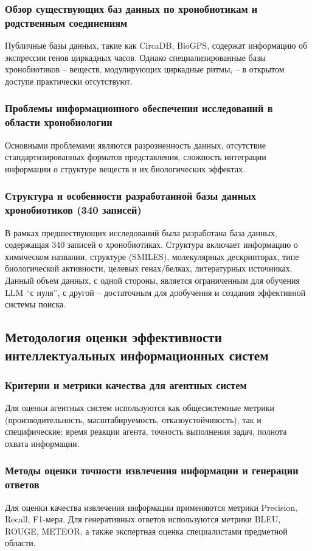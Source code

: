 \documentclass[a4paper,14pt]{extarticle}
\begin{document}
	\subsubsection{Обзор существующих баз данных по хронобиотикам и родственным соединениям}
	Публичные базы данных, такие как CircaDB, BioGPS, содержат информацию об экспрессии генов циркадных часов. Однако специализированные базы хронобиотиков – веществ, модулирующих циркадные ритмы, – в открытом доступе практически отсутствуют.
	
	\subsubsection{Проблемы информационного обеспечения исследований в области хронобиологии}
	Основными проблемами являются разрозненность данных, отсутствие стандартизированных форматов представления, сложность интеграции информации о структуре веществ и их биологических эффектах.
	
	\subsubsection{Структура и особенности разработанной базы данных хронобиотиков (340 записей)}
	В рамках предшествующих исследований была разработана база данных, содержащая 340 записей о хронобиотиках. Структура включает информацию о химическом названии, структуре (SMILES), молекулярных дескрипторах, типе биологической активности, целевых генах/белках, литературных источниках. Данный объем данных, с одной стороны, является ограниченным для обучения LLM ``с нуля'', с другой – достаточным для дообучения и создания эффективной системы поиска.
	
	\subsection{Методология оценки эффективности интеллектуальных информационных систем}
	
	\subsubsection{Критерии и метрики качества для агентных систем}
	Для оценки агентных систем используются как общесистемные метрики (производительность, масштабируемость, отказоустойчивость), так и специфические: время реакции агента, точность выполнения задач, полнота охвата информации.
	
	\subsubsection{Методы оценки точности извлечения информации и генерации ответов}
	Для оценки качества извлечения информации применяются метрики Precision, Recall, F1-мера. Для генеративных ответов используются метрики BLEU, ROUGE, METEOR, а также экспертная оценка специалистами предметной области.
	
\end{document}
